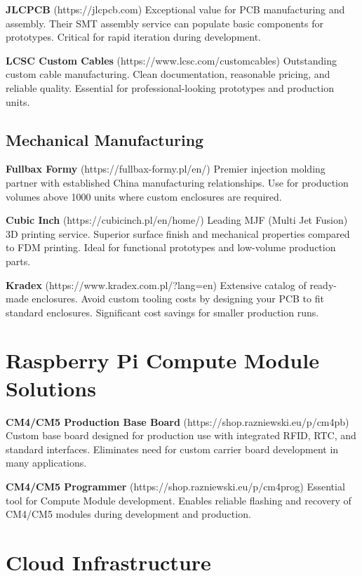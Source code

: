 \textbf{JLCPCB} (https://jlcpcb.com)
Exceptional value for PCB manufacturing and assembly. Their SMT assembly service can populate basic components for prototypes. Critical for rapid iteration during development.

\textbf{LCSC Custom Cables} (https://www.lcsc.com/customcables)
Outstanding custom cable manufacturing. Clean documentation, reasonable pricing, and reliable quality. Essential for professional-looking prototypes and production units.

\subsection{Mechanical Manufacturing}

\textbf{Fullbax Formy} (https://fullbax-formy.pl/en/)
Premier injection molding partner with established China manufacturing relationships. Use for production volumes above 1000 units where custom enclosures are required.

\textbf{Cubic Inch} (https://cubicinch.pl/en/home/)
Leading MJF (Multi Jet Fusion) 3D printing service. Superior surface finish and mechanical properties compared to FDM printing. Ideal for functional prototypes and low-volume production parts.

\textbf{Kradex} (https://www.kradex.com.pl/?lang=en)
Extensive catalog of ready-made enclosures. Avoid custom tooling costs by designing your PCB to fit standard enclosures. Significant cost savings for smaller production runs.

\section{Raspberry Pi Compute Module Solutions}

\textbf{CM4/CM5 Production Base Board} (https://shop.razniewski.eu/p/cm4pb)
Custom base board designed for production use with integrated RFID, RTC, and standard interfaces. Eliminates need for custom carrier board development in many applications.

\textbf{CM4/CM5 Programmer} (https://shop.razniewski.eu/p/cm4prog)
Essential tool for Compute Module development. Enables reliable flashing and recovery of CM4/CM5 modules during development and production.

\section{Cloud Infrastructure}

